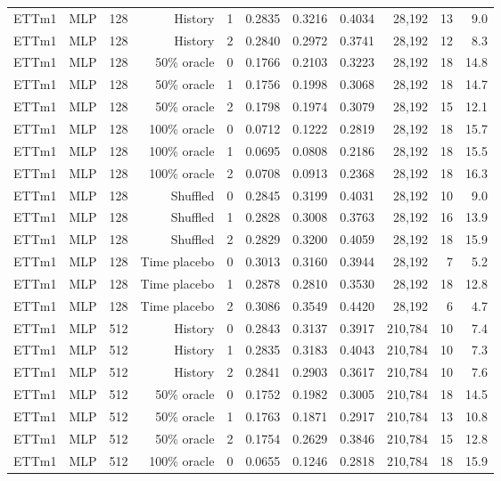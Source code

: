 \begin{landscape}
\begin{longtable}{@{}lllrlrrrrrr@{}}
ETTm1 & MLP & 128 & History & 1 & 0.2835 & 0.3216 & 0.4034 & 28,192 & 13 & 9.0 \\
ETTm1 & MLP & 128 & History & 2 & 0.2840 & 0.2972 & 0.3741 & 28,192 & 12 & 8.3 \\
ETTm1 & MLP & 128 & 50\% oracle & 0 & 0.1766 & 0.2103 & 0.3223 & 28,192 & 18 & 14.8 \\
ETTm1 & MLP & 128 & 50\% oracle & 1 & 0.1756 & 0.1998 & 0.3068 & 28,192 & 18 & 14.7 \\
ETTm1 & MLP & 128 & 50\% oracle & 2 & 0.1798 & 0.1974 & 0.3079 & 28,192 & 15 & 12.1 \\
ETTm1 & MLP & 128 & 100\% oracle & 0 & 0.0712 & 0.1222 & 0.2819 & 28,192 & 18 & 15.7 \\
ETTm1 & MLP & 128 & 100\% oracle & 1 & 0.0695 & 0.0808 & 0.2186 & 28,192 & 18 & 15.5 \\
ETTm1 & MLP & 128 & 100\% oracle & 2 & 0.0708 & 0.0913 & 0.2368 & 28,192 & 18 & 16.3 \\
ETTm1 & MLP & 128 & Shuffled & 0 & 0.2845 & 0.3199 & 0.4031 & 28,192 & 10 & 9.0 \\
ETTm1 & MLP & 128 & Shuffled & 1 & 0.2828 & 0.3008 & 0.3763 & 28,192 & 16 & 13.9 \\
ETTm1 & MLP & 128 & Shuffled & 2 & 0.2829 & 0.3200 & 0.4059 & 28,192 & 18 & 15.9 \\
ETTm1 & MLP & 128 & Time placebo & 0 & 0.3013 & 0.3160 & 0.3944 & 28,192 & 7 & 5.2 \\
ETTm1 & MLP & 128 & Time placebo & 1 & 0.2878 & 0.2810 & 0.3530 & 28,192 & 18 & 12.8 \\
ETTm1 & MLP & 128 & Time placebo & 2 & 0.3086 & 0.3549 & 0.4420 & 28,192 & 6 & 4.7 \\
ETTm1 & MLP & 512 & History & 0 & 0.2843 & 0.3137 & 0.3917 & 210,784 & 10 & 7.4 \\
ETTm1 & MLP & 512 & History & 1 & 0.2835 & 0.3183 & 0.4043 & 210,784 & 10 & 7.3 \\
ETTm1 & MLP & 512 & History & 2 & 0.2841 & 0.2903 & 0.3617 & 210,784 & 10 & 7.6 \\
ETTm1 & MLP & 512 & 50\% oracle & 0 & 0.1752 & 0.1982 & 0.3005 & 210,784 & 18 & 14.5 \\
ETTm1 & MLP & 512 & 50\% oracle & 1 & 0.1763 & 0.1871 & 0.2917 & 210,784 & 13 & 10.8 \\
ETTm1 & MLP & 512 & 50\% oracle & 2 & 0.1754 & 0.2629 & 0.3846 & 210,784 & 15 & 12.8 \\
ETTm1 & MLP & 512 & 100\% oracle & 0 & 0.0655 & 0.1246 & 0.2818 & 210,784 & 18 & 15.9 \\

\end{longtable}
\end{landscape}
